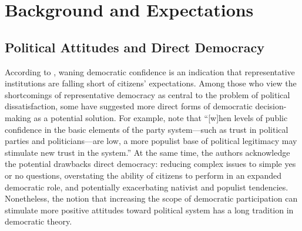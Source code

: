 \documentclass[12pt, letter]{article}
\begin{document}
\section{Background and Expectations}

\subsection{Political Attitudes and Direct Democracy}

According to \textcite{pharr2000quarter}, waning democratic confidence is an indication that representative institutions are falling short of citizens' expectations. Among those who view the shortcomings of representative democracy as central to the problem of political dissatisfaction, some have suggested more direct forms of democratic decision-making as a potential solution. For example, \textcite[149]{dalton2001public} note that ``[w]hen levels of public confidence in the basic elements of the party system---such as trust in political parties and politicians---are low, a more populist base of political legitimacy may stimulate new trust in the system.'' At the same time, the authors acknowledge the potential drawbacks direct democracy: reducing complex issues to simple yes or no questions, overstating the ability of citizens to perform in an expanded democratic role, and potentially exacerbating nativist and populist tendencies. Nonetheless, the notion that increasing the scope of democratic participation can stimulate more positive attitudes toward political system has a long tradition in democratic theory. 
\end{document}
